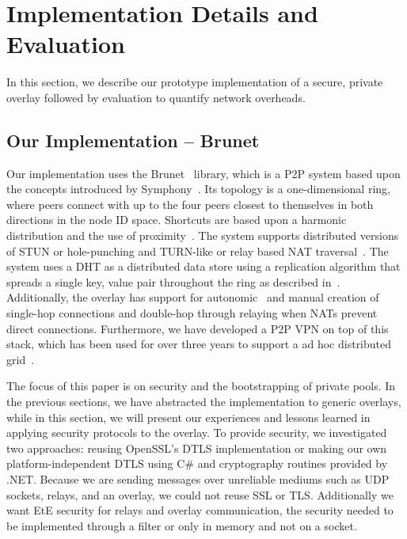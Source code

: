 \documentclass[conference]{IEEEtran}
\begin{document}
\section{Implementation Details and Evaluation}
\label{evaluations}
In this section, we describe our prototype implementation of a secure, private
overlay followed by evaluation to quantify network overheads.

\subsection{Our Implementation -- Brunet}
\label{implementation}
Our implementation uses the Brunet~\cite{brunet} library, which is a P2P system
based upon the concepts introduced by Symphony~\cite{symphony}.  Its topology is a
one-dimensional ring, where peers connect with up to the four peers closest
to themselves in both directions in the node ID space.  Shortcuts are based
upon a harmonic distribution and the use of proximity~\cite{hpdc08_0}.  The
system supports distributed versions of STUN or hole-punching and TURN-like or
relay based NAT traversal~\cite{nsdi10}.  The system uses a DHT as a distributed
data store using a replication algorithm that spreads a single key, value pair
throughout the ring as described in~\cite{pcgrid07}.  Additionally, the overlay
has support for autonomic~\cite{wow} and manual creation of single-hop
connections and double-hop through relaying when NATs prevent direct
connections.  Furthermore, we have developed a P2P VPN on top of this stack,
which has been used for over three years to support a ad hoc distributed
grid~\cite{archer, gridappliance}.

The focus of this paper is on security and the bootstrapping of private pools.
In the previous sections, we have abstracted the implementation to generic
overlays, while in this section, we will present our experiences and lessons
learned in applying security protocols to the overlay.  To provide security, we
investigated two approaches:  reusing OpenSSL's DTLS implementation or making
our own platform-independent DTLS using C\# and cryptography routines provided
by .NET.  Because we are sending messages over unreliable mediums such as UDP
sockets, relays, and an overlay, we could not reuse SSL or TLS.  Additionally
we want EtE security for relays and overlay communication, the security needed
to be implemented through a filter or only in memory and not on a socket.
\end{document}

